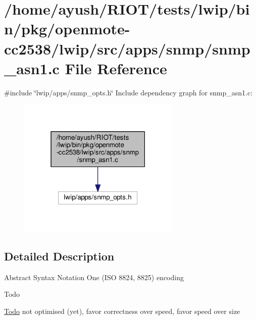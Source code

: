 \hypertarget{openmote-cc2538_2lwip_2src_2apps_2snmp_2snmp__asn1_8c}{}\section{/home/ayush/\+R\+I\+O\+T/tests/lwip/bin/pkg/openmote-\/cc2538/lwip/src/apps/snmp/snmp\+\_\+asn1.c File Reference}
\label{openmote-cc2538_2lwip_2src_2apps_2snmp_2snmp__asn1_8c}
{\ttfamily \#include \char`\"{}lwip/apps/snmp\+\_\+opts.\+h\char`\"{}}\newline
Include dependency graph for snmp\+\_\+asn1.\+c\+:
\nopagebreak
\begin{figure}[H]
\begin{center}
\leavevmode
\includegraphics[width=219pt]{openmote-cc2538_2lwip_2src_2apps_2snmp_2snmp__asn1_8c__incl}
\end{center}
\end{figure}


\subsection{Detailed Description}
Abstract Syntax Notation One (I\+SO 8824, 8825) encoding

\begin{DoxyRefDesc}{Todo}
\item[\hyperlink{todo__todo000014}{Todo}]not optimised (yet), favor correctness over speed, favor speed over size \end{DoxyRefDesc}
